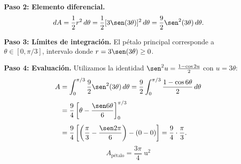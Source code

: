 \begin{example}[Área de un pétalo de la rosa $r = 3\sen(3\theta)$]
\begin{myproof}
\textbf{Paso 2: Elemento diferencial.}
\[
  dA = \frac{1}{2}r^2\,d\theta = \frac{1}{2}[3\sen(3\theta)]^2\,d\theta
     = \frac{9}{2}\sen^2(3\theta)\,d\theta.
\]

\textbf{Paso 3: Límites de integración.}
El pétalo principal corresponde a $\theta \in [0, \pi/3]$, intervalo donde
$r = 3\sen(3\theta) \geq 0$.

\textbf{Paso 4: Evaluación.}
Utilizamos la identidad $\sen^2 u = \frac{1-\cos 2u}{2}$ con $u = 3\theta$:
\begin{align*}
  A &= \int_{0}^{\pi/3} \frac{9}{2}\sen^2(3\theta)\,d\theta
     = \frac{9}{2}\int_{0}^{\pi/3} \frac{1 - \cos 6\theta}{2}\,d\theta \\[4pt]
    &= \frac{9}{4}\left[\theta - \frac{\sen 6\theta}{6}\right]_{0}^{\pi/3}\\[4pt]
    &= \frac{9}{4}\left[\left(\frac{\pi}{3} - \frac{\sen 2\pi}{6}\right)
       - \left(0 - 0\right)\right]
     = \frac{9}{4}\cdot\frac{\pi}{3}.
\end{align*}
\[
  \boxed{A_{\text{pétalo}} = \frac{3\pi}{4}\;\text{u}^2}
\]
\end{myproof}
\end{example}

